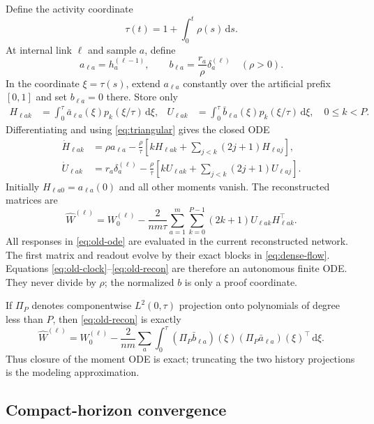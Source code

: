 \documentclass[11pt]{article}
\theoremstyle{definition}
\theoremstyle{remark}
\newcommand{\dd}{\,\mathrm{d}}
\begin{document}
Define the activity coordinate
\begin{equation}
 \tau(t)=1+\int_0^t\rho(s)\dd s.                    \label{eq:old-clock}
\end{equation}
At internal link $\ell$ and sample $a$, define
\[
 a_{\ell a}=h_a^{(\ell-1)},\qquad
 b_{\ell a}=\frac{r_a}{\rho}\delta_a^{(\ell)}\quad(\rho>0).
\]
In the coordinate $\xi=\tau(s)$, extend $a_{\ell a}$ constantly over the
artificial prefix $[0,1]$ and set $b_{\ell a}=0$ there.  Store only
\begin{align}
 H_{\ell ak}&=\int_0^\tau \bar a_{\ell a}(\xi)
 p_k(\xi/\tau)\dd\xi,&
 U_{\ell ak}&=\int_0^\tau \bar b_{\ell a}(\xi)
 p_k(\xi/\tau)\dd\xi,\quad 0\le k<P.               \label{eq:old-moments}
\end{align}
Differentiating and using \eqref{eq:triangular} gives the closed ODE
\begin{align}
 \dot H_{\ell ak}&=\rho a_{\ell a}-\frac{\rho}{\tau}
 \left[kH_{\ell ak}+\sum_{j<k}(2j+1)H_{\ell aj}\right],\nonumber\\
 \dot U_{\ell ak}&=r_a\delta_a^{(\ell)}-\frac{\rho}{\tau}
 \left[kU_{\ell ak}+\sum_{j<k}(2j+1)U_{\ell aj}\right]. \label{eq:old-ode}
\end{align}
Initially $H_{\ell a0}=a_{\ell a}(0)$ and all other moments vanish.  The
reconstructed matrices are
\begin{equation}
 \widehat W^{(\ell)}=W_0^{(\ell)}-\frac{2}{nm\tau}
 \sum_{a=1}^m\sum_{k=0}^{P-1}(2k+1)
 U_{\ell ak}H_{\ell ak}^\top.                       \label{eq:old-recon}
\end{equation}
All responses in \eqref{eq:old-ode} are evaluated in the current reconstructed
network.  The first matrix and readout evolve by their exact blocks in
\eqref{eq:dense-flow}.  Equations \eqref{eq:old-clock}--\eqref{eq:old-recon}
are therefore an autonomous finite ODE.  They never divide by $\rho$; the
normalized $b$ is only a proof coordinate.

If $\Pi_P$ denotes componentwise $L^2(0,\tau)$ projection onto polynomials of
degree less than $P$, then \eqref{eq:old-recon} is exactly
\begin{equation}
 \widehat W^{(\ell)}=W_0^{(\ell)}-\frac{2}{nm}\sum_a
 \int_0^\tau(\Pi_P\bar b_{\ell a})(\xi)
 (\Pi_P\bar a_{\ell a})(\xi)^\top\dd\xi.            \label{eq:projection-form}
\end{equation}
Thus closure of the moment ODE is exact; truncating the two history projections
is the modeling approximation.

\subsection{Compact-horizon convergence}
\end{document}
